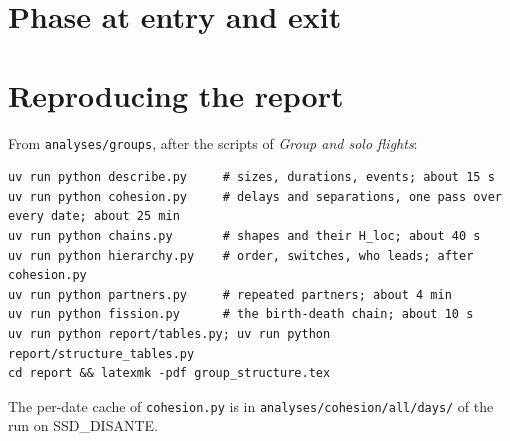 \section{Phase at entry and exit}\label{app:phases}

\begin{table}[H]
\centering\footnotesize

\caption{Phase at the instant of entering or leaving a group, and shares of time in each phase
(percent, with 5--95\% bands; 1~Hz flights).}
\label{tab:phases}
\end{table}

\section{Reproducing the report}\label{app:reproduce}

From \texttt{analyses/groups}, after the scripts of \emph{Group and solo flights}:
\begin{verbatim}
uv run python describe.py     # sizes, durations, events; about 15 s
uv run python cohesion.py     # delays and separations, one pass over every date; about 25 min
uv run python chains.py       # shapes and their H_loc; about 40 s
uv run python hierarchy.py    # order, switches, who leads; after cohesion.py
uv run python partners.py     # repeated partners; about 4 min
uv run python fission.py      # the birth-death chain; about 10 s
uv run python report/tables.py; uv run python report/structure_tables.py
cd report && latexmk -pdf group_structure.tex
\end{verbatim}
The per-date cache of \texttt{cohesion.py} is in \texttt{analyses/cohesion/all/days/} of the run on SSD\_DISANTE.
